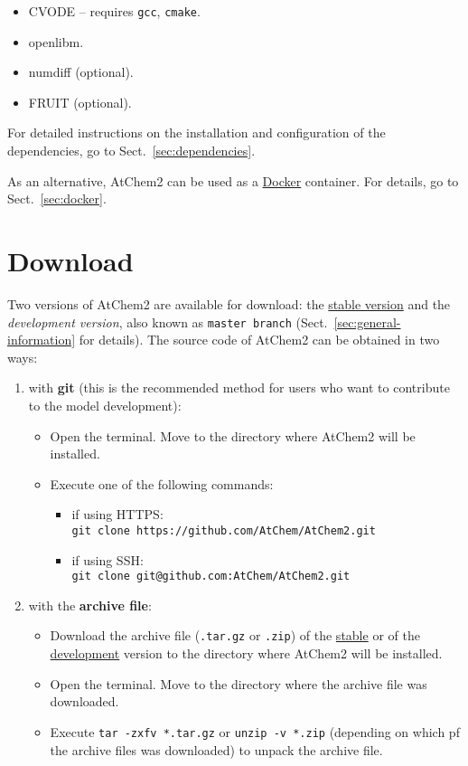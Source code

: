 \begin{itemize}
\item CVODE -- requires \texttt{gcc}, \texttt{cmake}. %
\item openlibm.
\item numdiff (optional).
\item FRUIT (optional).
\end{itemize}

For detailed instructions on the installation and configuration of the
dependencies, go to Sect.~\ref{sec:dependencies}.

As an alternative, AtChem2 can be used as a \href{https://www.docker.com}{Docker}
container. For details, go to Sect.~\ref{sec:docker}.

\section{Download} \label{sec:download}

Two versions of AtChem2 are available for download: the
\href{https://github.com/AtChem/AtChem2/releases}{stable version} and
the \emph{development version}, also known as \texttt{master\ branch}
(Sect.~\ref{sec:general-information} for details). The source code of
AtChem2 can be obtained in two ways:

\begin{enumerate}
\item with \textbf{git} (this is the recommended method for users who
  want to contribute to the model development):
  \begin{itemize}
  \item Open the terminal. Move to the directory where AtChem2 will be
    installed.
  \item Execute one of the following commands:
    \begin{itemize}
      \item if using HTTPS:\\
        \verb|git clone https://github.com/AtChem/AtChem2.git|
      \item if using SSH:\\
        \verb|git clone git@github.com:AtChem/AtChem2.git|
    \end{itemize}
  \end{itemize}
\item with the \textbf{archive file}:
  \begin{itemize}
  \item Download the archive file (\texttt{.tar.gz} or \texttt{.zip}) of the
    \href{https://github.com/AtChem/AtChem2/releases}{stable} or of the
    \href{https://github.com/AtChem/AtChem2/archive/master.zip}{development}
    version to the directory where AtChem2 will be installed.
  \item Open the terminal. Move to the directory where the archive
    file was downloaded.
  \item Execute \verb|tar -zxfv *.tar.gz| or \verb|unzip -v *.zip|
    (depending on which pf the archive files  was downloaded) to unpack
    the archive file.
  \end{itemize}
\end{enumerate}

